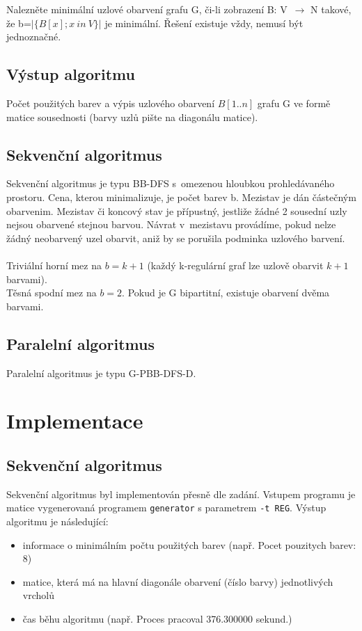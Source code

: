 \documentclass[12pt]{article}
\begin{document}
Nalezněte minimální uzlové obarvení grafu G, či-li zobrazení B: V~$\rightarrow$ N takové, že b=$\left|\{B[x]; x\ in\ V\}\right|$ je minimální. Řešení existuje vždy, nemusí být jednoznačné.

\subsection{Výstup algoritmu}

Počet použitých barev a výpis uzlového obarvení $B[1..n]$ grafu G ve formě matice sousednosti (barvy uzlů pište na diagonálu matice).\\

\subsection{Sekvenční algoritmus}

Sekvenční algoritmus je typu BB-DFS s~omezenou hloubkou prohledávaného prostoru. Cena, kterou minimalizuje, je počet barev b. Mezistav je dán částečným obarvenim. Mezistav či koncový stav je přípustný, jestliže žádné 2 sousední uzly nejsou obarvené stejnou barvou. Návrat v~mezistavu provádíme, pokud nelze žádný neobarvený uzel obarvit, aniž by se porušila podminka uzlového barvení.\\
\\
Triviální horní mez na $b=k+1$ (každý k-regulární graf lze uzlově obarvit $k+1$ barvami).\\
Těsná spodní mez na $b=2$. Pokud je G bipartitní, existuje obarvení dvěma barvami.


\subsection{Paralelní algoritmus}

Paralelní algoritmus je typu G-PBB-DFS-D. 

\section{Implementace}

\subsection{Sekvenční algoritmus}
Sekvenční algoritmus byl implementován přesně dle zadání. Vstupem programu je matice vygenerovaná programem \texttt{generator} s parametrem \texttt{-t REG}. Výstup algoritmu je následující:
\begin{itemize}
\item informace o minimálním počtu použitých barev (např. Pocet pouzitych barev: 8)
\item matice, která má na hlavní diagonále obarvení (číslo barvy) jednotlivých vrcholů
\item čas běhu algoritmu (např. Proces pracoval 376.300000 sekund.)
\end{itemize}
\end{document}
